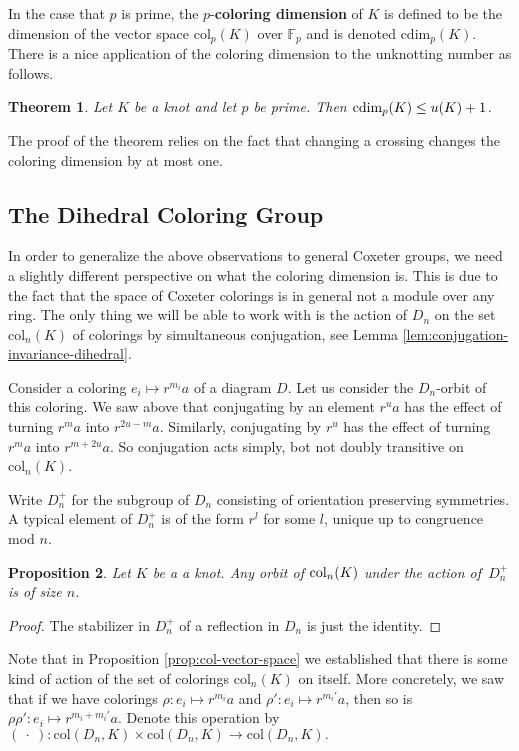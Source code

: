 \documentclass{article}
\newtheorem{theorem}{Theorem}[section]
\newtheorem{proposition}[theorem]{Proposition}
\theoremstyle{definition}
\begin{document}
In the case that $p$ is prime, the $p$-\textbf{coloring dimension} of $K$ is defined to be the dimension of the vector space $\text{col}_p(K)$ over $\mathbb{F}_p$ and is denoted $\text{cdim}_p(K)$. There is a nice application of the coloring dimension to the unknotting number as follows.

\begin{theorem}
Let $K$ be a knot and let $p$ be prime. Then $\textup{cdim}_p(K) \leq u(K) + 1$.
\end{theorem}
The proof of the theorem relies on the fact that changing a crossing changes the coloring dimension by at most one. 

\subsection{The Dihedral Coloring Group}\label{sec: dihedral-reformulating}
In order to generalize the above observations to general Coxeter groups, we need a slightly different perspective on what the coloring dimension is. This is due to the fact that the space of Coxeter colorings is in general not a module over any ring. The only thing we will be able to work with is the action of $D_n$ on the set $\text{col}_n(K)$ of colorings by simultaneous conjugation, see Lemma \ref{lem:conjugation-invariance-dihedral}.

Consider a coloring $e_i \mapsto r^{m_i}a$ of a diagram $D$. Let us consider the $D_n$-orbit of this coloring. We saw above that conjugating by an element $r^ua$ has the effect of turning $r^{m}a$ into $r^{2u - m}a$. Similarly, conjugating by $r^u$ has the effect of turning $r^ma$ into $r^{m+2u}a$. So conjugation acts simply, bot not doubly transitive on $\text{col}_n(K)$. 

Write $D_n^+$ for the subgroup of $D_n$ consisting of orientation preserving symmetries. A typical element of $D_n^+$ is of the form $r^l$ for some $l$, unique up to congruence mod $n$.

\begin{proposition}
Let $K$ be a a knot. Any orbit of $\textup{col}_n(K)$ under the action of~$D_n^+$ is of size $n$.
\end{proposition}

\begin{proof}
The stabilizer in $D_n^+$ of a reflection in $D_n$ is just the identity.
\end{proof}


Note that in Proposition \ref{prop:col-vector-space} we established that there is some kind of action of the set of colorings $\text{col}_n(K)$ on itself. More concretely, we saw that if we have colorings $\rho: e_i \mapsto r^{m_i}a$ and $\rho': e_i \mapsto r^{m_i'}a$, then so is $\rho\rho': e_i \mapsto r^{m_i + m_i'}a$. Denote this operation by $(\:\cdot\:): \text{col}(D_n,K) \times \text{col}(D_n,K) \rightarrow \text{col}(D_n,K).$ 
\end{document}
